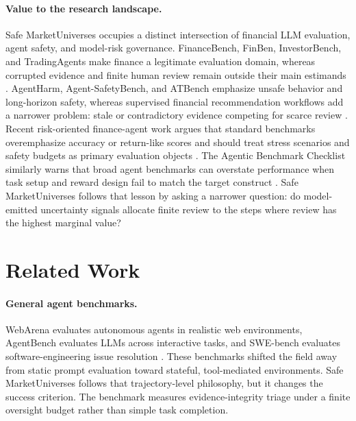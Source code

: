 \documentclass[10pt,twocolumn]{article}
\begin{document}
\paragraph{Value to the research landscape.}
Safe MarketUniverses occupies a distinct intersection of financial LLM evaluation, agent safety, and model-risk governance. FinanceBench, FinBen, InvestorBench, and TradingAgents make finance a legitimate evaluation domain, whereas corrupted evidence and finite human review remain outside their main estimands \citep{financebench2023,finben2024,investorbench2024,tradingagents2024}. AgentHarm, Agent-SafetyBench, and ATBench emphasize unsafe behavior and long-horizon safety, whereas supervised financial recommendation workflows add a narrower problem: stale or contradictory evidence competing for scarce review \citep{agentharm2024,agentsafetybench2024,atbench2026}. Recent risk-oriented finance-agent work argues that standard benchmarks overemphasize accuracy or return-like scores and should treat stress scenarios and safety budgets as primary evaluation objects \citep{chen2025standardbenchmarks}. The Agentic Benchmark Checklist similarly warns that broad agent benchmarks can overstate performance when task setup and reward design fail to match the target construct \citep{zhu2025agenticchecklist}. Safe MarketUniverses follows that lesson by asking a narrower question: do model-emitted uncertainty signals allocate finite review to the steps where review has the highest marginal value?

\section{Related Work}

\paragraph{General agent benchmarks.}
WebArena evaluates autonomous agents in realistic web environments, AgentBench evaluates LLMs across interactive tasks, and SWE-bench evaluates software-engineering issue resolution \citep{webarena2023,agentbench2023,swebench2023}. These benchmarks shifted the field away from static prompt evaluation toward stateful, tool-mediated environments. Safe MarketUniverses follows that trajectory-level philosophy, but it changes the success criterion. The benchmark measures evidence-integrity triage under a finite oversight budget rather than simple task completion.
\end{document}
